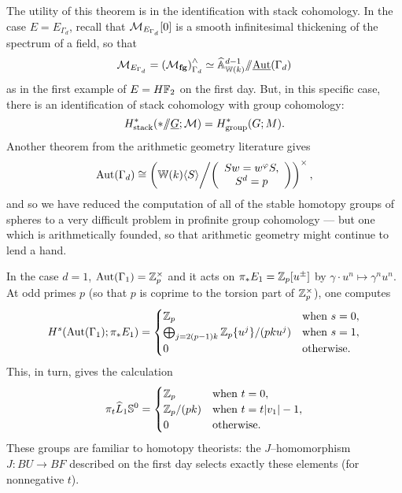 The utility of this theorem is in the identification with stack cohomology.  In the case $E = E_{\Gamma_d}$, recall that $\M_{E_{\Gamma_d}}[0]$ is a smooth infinitesimal thickening of the spectrum of a field, so that \[\M_{E_{\Gamma_d}} = \left( \moduli{fg} \right)^\wedge_{\Gamma_d} \simeq \widehat{\mathbb A}^{d-1}_{\mathbb W(k)} \mmod \underline{\operatorname{Aut}}(\Gamma_d)\] as in the first example of $E = H\F_2$ on the first day.  But, in this specific case, there is an identification of stack cohomology with group cohomology: \[H^*_{\mathrm{stack}}(* \mmod \underline{G}; \mathcal M) = H^*_{\mathrm{group}}(G; M).\]  Another theorem from the arithmetic geometry literature gives \[\operatorname{Aut}(\Gamma_d) \cong \left( \mathbb{W}(k)\langle S \rangle \middle/ \left( \begin{array}{c} Sw = w^\phi S, \\ S^d = p \end{array} \right) \right)^\times,\] and so we have reduced the computation of all of the stable homotopy groups of spheres to a very difficult problem in profinite group cohomology --- but one which is arithmetically founded, so that arithmetic geometry might continue to lend a hand.

\begin{example}[Adams]
In the case $d = 1$, $\operatorname{Aut}(\Gamma_1) = \Z_p^\times$ and it acts on $\pi_* E_1 = \Z_p[u^\pm]$ by $\gamma \cdot u^n \mapsto \gamma^n u^n$.  At odd primes $p$ (so that $p$ is coprime to the torsion part of $\Z_p^\times$), one computes \[H^s(\operatorname{Aut}(\Gamma_1); \pi_* E_1) = \begin{cases}\Z_p & \text{when $s = 0$}, \\ \bigoplus_{j = 2(p-1)k} \Z_p\{u^j\} / (pk u^j) & \text{when $s = 1$}, \\ 0 & \text{otherwise}. \end{cases}\]  This, in turn, gives the calculation \[\pi_t \widehat L_1 \S^0 = \begin{cases} \Z_p & \text{when $t = 0$}, \\ \Z_p / (pk) & \text{when $t = t|v_1| - 1$}, \\ 0 & \text{otherwise}. \end{cases}\]  These groups are familiar to homotopy theorists: the $J$--homomorphism $J: BU \to BF$ described on the first day selects exactly these elements (for nonnegative $t$).
\end{example}








